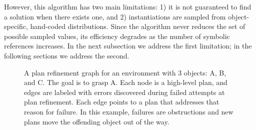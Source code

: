However, this algorithm has two
main limitations: 1) it is not guaranteed to find a solution when
there exists one, and 2) instantiations
are sampled from object-specific, hand-coded distributions. Since the algorithm
never reduces the set of possible sampled values, its
efficiency degrades as the number of symbolic references increases. In the next subsection
we address the first limitation; in the following sections we address the second.

\begin{figure}[t]
  \centering
  \caption{\small{A plan refinement graph for an environment with 3
      objects: A, B, and C. The goal is to grasp A. Each node is a
      high-level plan, and edges are labeled with errors discovered during
      failed attempts at plan refinement. Each edge points to a plan
      that addresses that reason for failure. In this example, failures
      are obstructions and new plans move the offending object out of
      the way.}}
  \label{fig:prg}
\end{figure}

